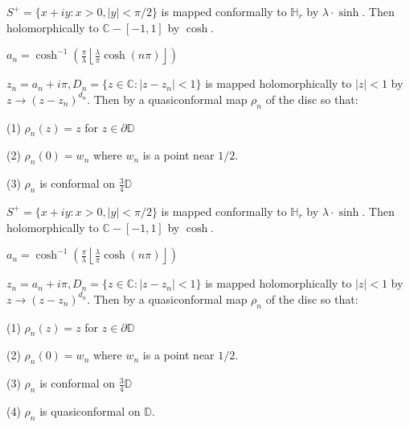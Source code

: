 \documentclass{beamer}
\begin{document}
\begin{frame} 

$S^+ = \{ x + iy : x > 0, |y| < \pi/2 \}$ is mapped conformally to $\mathbb{H}_r$ by $\lambda\cdot\sinh$. Then holomorphically to $\mathbb{C} - [-1,1]$ by $\cosh$.

\vspace{2.5mm}

$a_n = \cosh^{-1}\left( \frac{\pi}{\lambda} \left \lfloor{ \frac{\lambda}{\pi} \cosh(n\pi) }\right \rfloor \right)$

\vspace{2.5mm}

$z_n = a_n + i\pi, D_n = \{ z \in \mathbb{C} : \left| z - z_n \right| < 1\} $ is mapped holomorphically to $|z|<1$ by $z\rightarrow (z - z_n)^{d_n}$. Then by a quasiconformal map $\rho_n$ of the disc so that: 

\hspace{5mm} (1) $\rho_n(z)=z$ for $z\in\partial\mathbb{D}$

\hspace{5mm} (2) $\rho_n(0)=w_n$ where $w_n$ is a point near $1/2$.

\hspace{5mm} (3) $\rho_n$ is conformal on $\frac{3}{4}\mathbb{D}$

\end{frame}




\begin{frame} 

$S^+ = \{ x + iy : x > 0, |y| < \pi/2 \}$ is mapped conformally to $\mathbb{H}_r$ by $\lambda\cdot\sinh$. Then holomorphically to $\mathbb{C} - [-1,1]$ by $\cosh$.

\vspace{2.5mm}

$a_n = \cosh^{-1}\left( \frac{\pi}{\lambda} \left \lfloor{ \frac{\lambda}{\pi} \cosh(n\pi) }\right \rfloor \right)$

\vspace{2.5mm}

$z_n = a_n + i\pi, D_n = \{ z \in \mathbb{C} : \left| z - z_n \right| < 1\} $ is mapped holomorphically to $|z|<1$ by $z\rightarrow (z - z_n)^{d_n}$. Then by a quasiconformal map $\rho_n$ of the disc so that: 

\hspace{5mm} (1) $\rho_n(z)=z$ for $z\in\partial\mathbb{D}$

\hspace{5mm} (2) $\rho_n(0)=w_n$ where $w_n$ is a point near $1/2$.

\hspace{5mm} (3) $\rho_n$ is conformal on $\frac{3}{4}\mathbb{D}$

\hspace{5mm} (4) $\rho_n$ is quasiconformal on $\mathbb{D}$. 

\end{frame}
\end{document}
